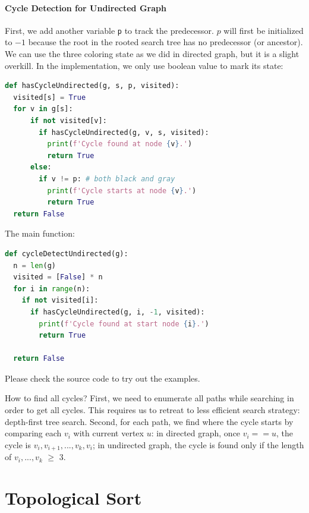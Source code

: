 \documentclass[../main.tex]{subfiles}
\begin{document}
\paragraph{Cycle Detection for Undirected Graph} First, we add another variable \texttt{p} to track the predecessor. 
$p$ will first be initialized to $-1$ because the root in the rooted search tree has no predecessor (or ancestor).  
 We can use the three coloring state as we did in directed graph, but it is a slight overkill. 
 In the implementation, we only use boolean value to mark its state:
\begin{lstlisting}[language=Python]
def hasCycleUndirected(g, s, p, visited):
  visited[s] = True
  for v in g[s]:
      if not visited[v]:
        if hasCycleUndirected(g, v, s, visited):
          print(f'Cycle found at node {v}.')
          return True
      else:
        if v != p: # both black and gray
          print(f'Cycle starts at node {v}.')
          return True
  return False
\end{lstlisting}
The main function:
\begin{lstlisting}[language=Python]
def cycleDetectUndirected(g):
  n = len(g)
  visited = [False] * n
  for i in range(n):
    if not visited[i]:
      if hasCycleUndirected(g, i, -1, visited):
        print(f'Cycle found at start node {i}.')
        return True

  return False
\end{lstlisting}
Please check the source code to try out the examples.

\begin{bclogo}[couleur = blue!30, arrondi=0.1,logo=\bccrayon,ombre=true]{How to find all cycles? {First, we need to enumerate all paths while searching in order to get all cycles. This requires us to retreat to less efficient search strategy: depth-first tree search. Second, for each path, we find where the cycle starts by comparing each $v_i$ with current vertex $u$: in directed graph, once $v_i==u$, the cycle is $v_i, v_{i+1}, ..., v_k, v_i$; in undirected graph, the cycle is found only if the length of $v_i, ..., v_k$ $\geq$ 3.}} 
\end{bclogo}

\section{Topological Sort}
\label{sec_topological_sort}
\end{document}

